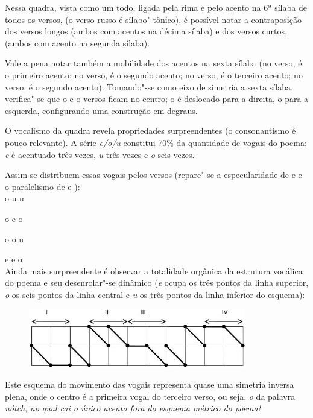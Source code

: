 Nessa quadra, vista como um todo, ligada pela rima  e pelo acento na
6ª sílaba de todos os versos, (o verso russo é sílabo"-tônico), é
possível notar a contraposição dos versos longos (ambos com acentos na
décima sílaba) e dos versos curtos, (ambos com acento na segunda
sílaba).

Vale a pena notar também a mobilidade dos acentos na sexta sílaba (no 
verso, é o primeiro acento; no  verso, é o segundo acento; no 
verso, é o terceiro acento; no  verso, é o segundo acento). Tomando"-se
como eixo de simetria a sexta sílaba, verifica"-se que o  e o  versos
ficam no centro; o  é deslocado para a direita, o  para a esquerda,
configurando uma construção em degraus.

O vocalismo da quadra revela propriedades surpreendentes (o
consonantismo é pouco relevante). A série \emph{e/o/u} constitui 70\% da
quantidade de vogais do poema: \emph{e} é acentuado três vezes, \emph{u}
três vezes e \emph{o} seis vezes.

Assim se distribuem essas vogais pelos versos (repare"-se a
especularidade de  e  e o paralelismo de  e ): \\

o u u

o e o

o o u

e e o \\

Ainda mais surpreendente é observar a totalidade orgânica da estrutura
vocálica do poema e seu desenrolar"-se dinâmico (\emph{e} ocupa os três
pontos da linha superior, \emph{o} os seis pontos da linha central e
\emph{u} os três pontos da linha inferior do esquema):

\begin{figure}[!ht]
\centering
  \includegraphics[width=95mm]{./imgs/fig5.jpg}
\end{figure}

Este esquema do movimento das vogais representa quase uma simetria
inversa plena, onde o centro é a primeira vogal do terceiro verso, ou
seja, \emph{o} da palavra \emph{nótch}, \emph{no qual cai o único
acento fora do esquema métrico do poema!}

